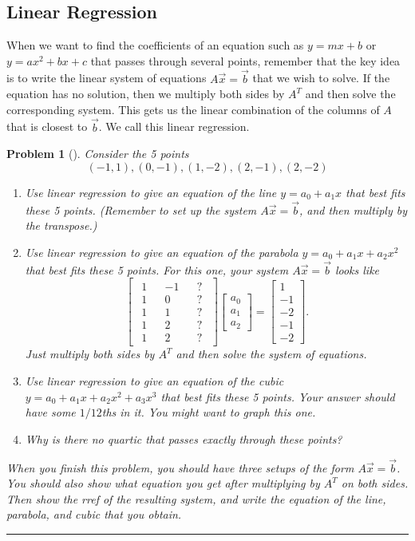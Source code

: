 \documentclass[letterpaper,oneside]{book}%
\theoremstyle{plain}
\theoremstyle{box}
\theoremstyle{problem}
\newtheorem{problemnum}{Problem}[chapter]
\newenvironment{problem}[1][]{\begin{problemnum}[#1]}{\end{problemnum}\nopagebreak\hrule\bigskip}
\newcommand{\nvec}[1]{\begin{matrix} #1 \end{matrix}}
\newcommand{\bvec}[1]{\begin{bmatrix} #1 \end{bmatrix}}
\begin{document}
\subsection*{Linear Regression}
When we want to find the coefficients of an equation such as $y=mx+b$ or $y=ax^2+bx+c$ that passes through several points, remember that the key idea is to write the linear system of equations $A\vec x=\vec b$ that we wish to solve.  If the equation has no solution, then we multiply both sides by $A^T$ and then solve the corresponding system.  This gets us the linear combination of the columns of $A$ that is closest to $\vec b$. We call this linear regression. 
\begin{problem}
 Consider the 5 points 
$$ 
(-1,  1),
( 0, -1),
( 1, -2),
( 2, -1),
( 2, -2)
$$
\begin{enumerate}
 \item Use linear regression to give an equation of the line $y=a_0+a_1x$ that best fits these 5 points. (Remember to set up the system $A\vec x = \vec b$, and then multiply by the transpose.) 
 \item Use linear regression to give an equation of the parabola $y=a_0+a_1x+a_2x^2$ that best fits these 5 points. 
 For this one, your system $A\vec x=\vec b$ looks like 
 $$\bvec{\nvec{1\\1\\1\\1\\1}&\nvec{-1\\0\\1\\2\\2}&\nvec{?\\?\\?\\?\\?}}\bvec{a_0\\a_1\\a_2}=\bvec{1\\-1\\-2\\-1\\-2}.$$ Just multiply both sides by $A^T$ and then solve the system of equations. 
 \item Use linear regression to give an equation of the cubic $y=a_0+a_1x+a_2x^2+a_3x^3$ that best fits these 5 points. Your answer should have some $1/12$ths in it. You might want to graph this one.   
 \item Why is there no quartic that passes exactly through these points?
\end{enumerate}
When you finish this problem, you should have three setups of the form $A\vec x=\vec b$. You should also show what equation you get after multiplying by $A^T$ on both sides.  Then show the rref of the resulting system, and write the equation of the line, parabola, and cubic that you obtain. 
\end{problem}
\end{document}
